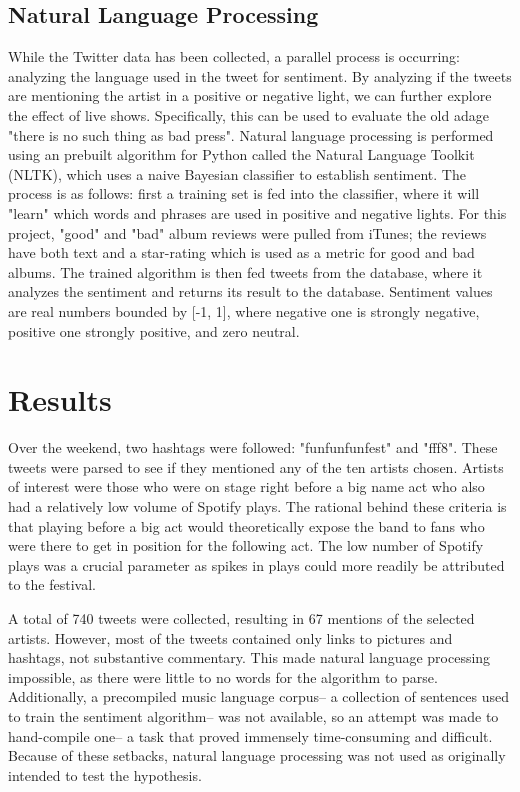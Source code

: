 \documentclass{article}
\begin{document}
\subsection{Natural Language Processing} 
While the Twitter data has been collected, a parallel process is occurring: analyzing the language used in the tweet for sentiment. By analyzing if the tweets are mentioning the artist in a positive or negative light, we can further explore the effect of live shows. Specifically, this can be used to evaluate the old adage "there is no such thing as bad press". Natural language processing is performed using an prebuilt algorithm for Python called the Natural Language Toolkit (NLTK), which uses a naive Bayesian classifier to establish sentiment. The process is as follows: first a training set is fed into the classifier, where it will "learn" which words and phrases are used in positive and negative lights. For this project, "good" and "bad" album reviews were pulled from iTunes; the reviews have both text and a star-rating which is used as a metric for good and bad albums. The trained algorithm is then fed tweets from the database, where it analyzes the sentiment and returns its result to the database. Sentiment values are real numbers bounded by [-1, 1], where negative one is strongly negative, positive one strongly positive, and zero neutral. 

\section{Results}
Over the weekend, two hashtags were followed: "funfunfunfest" and "fff8". These tweets were parsed to see if they mentioned any of the ten artists chosen. Artists of interest were those who were on stage right before a big name act who also had a relatively low volume of Spotify plays. The rational behind these criteria is that playing before a big act would theoretically expose the band to fans who were there to get in position for the following act. The low number of Spotify plays was a crucial parameter as spikes in plays could more readily be attributed to the festival. \*

A total of 740 tweets were collected, resulting in 67 mentions of the selected artists. However, most of the tweets contained only links to pictures and hashtags, not substantive commentary. This made natural language processing impossible, as there were little to no words for the algorithm to parse. Additionally, a precompiled music language corpus-- a collection of sentences used to train the sentiment algorithm-- was not available, so an attempt was made to hand-compile one-- a task that proved immensely time-consuming and difficult. Because of these setbacks, natural language processing was not used as originally intended to test the hypothesis. \*
\end{document}
